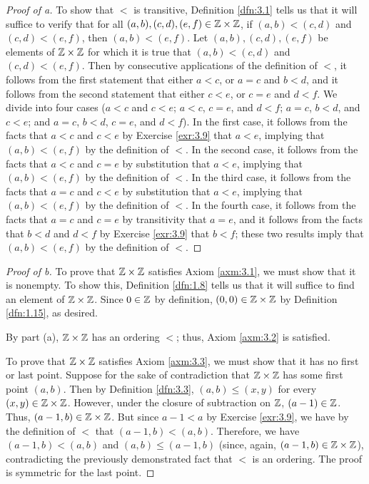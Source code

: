 \documentclass[../main.tex]{subfiles}
\begin{document}
\begin{enumerate}
\begin{proof}[Proof of a]
        To show that $<$ is transitive, Definition \ref{dfn:3.1} tells us that it will suffice to verify that for all $(a,b),(c,d),(e,f)\in\mathbb{Z}\times\mathbb{Z}$, if $(a,b)<(c,d)$ and $(c,d)<(e,f)$, then $(a,b)<(e,f)$. Let $(a,b),(c,d),(e,f)$ be elements of $\mathbb{Z}\times\mathbb{Z}$ for which it is true that $(a,b)<(c,d)$ and $(c,d)<(e,f)$. Then by consecutive applications of the definition of $<$, it follows from the first statement that either $a<c$, or $a=c$ and $b<d$, and it follows from the second statement that either $c<e$, or $c=e$ and $d<f$. We divide into four cases ($a<c$ and $c<e$; $a<c$, $c=e$, and $d<f$; $a=c$, $b<d$, and $c<e$; and $a=c$, $b<d$, $c=e$, and $d<f$). In the first case, it follows from the facts that $a<c$ and $c<e$ by Exercise \ref{exr:3.9} that $a<e$, implying that $(a,b)<(e,f)$ by the definition of $<$. In the second case, it follows from the facts that $a<c$ and $c=e$ by substitution that $a<e$, implying that $(a,b)<(e,f)$ by the definition of $<$. In the third case, it follows from the facts that $a=c$ and $c<e$ by substitution that $a<e$, implying that $(a,b)<(e,f)$ by the definition of $<$. In the fourth case, it follows from the facts that $a=c$ and $c=e$ by transitivity that $a=e$, and it follows from the facts that $b<d$ and $d<f$ by Exercise \ref{exr:3.9} that $b<f$; these two results imply that $(a,b)<(e,f)$ by the definition of $<$.
    \end{proof}
    \begin{proof}[Proof of b]
        To prove that $\mathbb{Z}\times\mathbb{Z}$ satisfies Axiom \ref{axm:3.1}, we must show that it is nonempty. To show this, Definition \ref{dfn:1.8} tells us that it will suffice to find an element of $\mathbb{Z}\times\mathbb{Z}$. Since $0\in\mathbb{Z}$ by definition, $(0,0)\in\mathbb{Z}\times\mathbb{Z}$ by Definition \ref{dfn:1.15}, as desired.\par
        By part (a), $\mathbb{Z}\times\mathbb{Z}$ has an ordering $<$; thus, Axiom \ref{axm:3.2} is satisfied.\par
        To prove that $\mathbb{Z}\times\mathbb{Z}$ satisfies Axiom \ref{axm:3.3}, we must show that it has no first or last point. Suppose for the sake of contradiction that $\mathbb{Z}\times\mathbb{Z}$ has some first point $(a,b)$. Then by Definition \ref{dfn:3.3}, $(a,b)\leq(x,y)$ for every $(x,y)\in\mathbb{Z}\times\mathbb{Z}$. However, under the closure of subtraction on $\mathbb{Z}$, $(a-1)\in\mathbb{Z}$. Thus, $(a-1,b)\in\mathbb{Z}\times\mathbb{Z}$. But since $a-1<a$ by Exercise \ref{exr:3.9}, we have by the definition of $<$ that $(a-1,b)<(a,b)$. Therefore, we have $(a-1,b)<(a,b)$ and $(a,b)\leq(a-1,b)$ (since, again, $(a-1,b)\in\mathbb{Z}\times\mathbb{Z}$), contradicting the previously demonstrated fact that $<$ is an ordering. The proof is symmetric for the last point.

\end{proof}
\end{enumerate}
\end{document}
